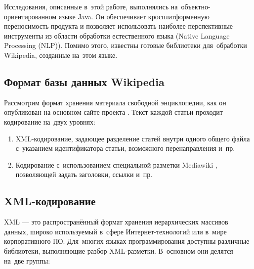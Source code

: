
Исследования, описанные в~этой работе, выполнялись на~объектно-ориентированном языке Java.
Он обеспечивает кросплатформенную переносимость продукта
и позволяет использовать наиболее перспективные инструменты из области обработки естественного языка (Native Language Processing (NLP)).
Помимо этого, известны готовые библиотеки для~обработки Wikipedia, созданные на~этом языке.

\subsection{Формат базы данных Wikipedia}

Рассмотрим формат хранения материала свободной энциклопедии, 
как он опубликован на основном сайте проекта \cite{download}. 
Текст каждой статьи проходит кодирование на~двух уровнях:

\begin{enumerate}

\item {
XML-кодирование, задающее разделение статей внутри одного общего
файла с~указанием идентификатора статьи, возможного перенаправления и~пр.
}

\item{
Кодирование с~использованием специальной разметки Mediawiki \cite{wikimarkup},
позволяющей задать заголовки, ссылки и~пр.
}

\end{enumerate}

\subsection{XML-кодирование}

XML --- это распространённый формат хранения иерархических массивов данных, 
широко используемый в~сфере Интернет-технологий или в~мире корпоративного ПО. 
Для~многих языках программирования доступны различные библиотеки, 
выполняющие разбор XML-разметки. 
В~основном они делятся на~две группы: 

